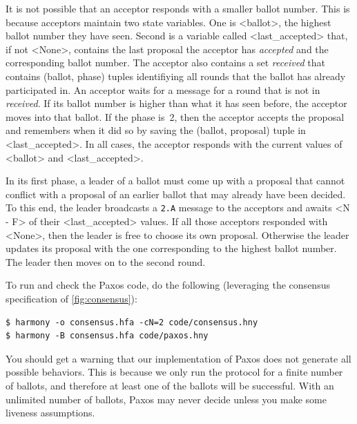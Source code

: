 \documentclass{report}
\newenvironment{code}{
\tcolorbox
}{
\endtcolorbox
}
\begin{document}
It is not possible that an acceptor responds with a smaller ballot
number.  This is because acceptors maintain two state variables.
One is <{ballot}>, the highest ballot number they have seen.
Second is a variable called <{last_accepted}> that, if not
<{None}>, contains the last proposal the acceptor has
\emph{accepted} and the corresponding ballot number.  The acceptor
also contains a set \emph{received} that contains (ballot, phase)
tuples identifiying all rounds that the ballot has already participated
in.  An acceptor waits for a message for a round that is not in
\emph{received}.  If its ballot number is higher than what it has
seen before, the acceptor moves into that ballot.  If the phase is~2,
then the acceptor accepts the proposal and remembers when it did
so by saving the (ballot, proposal) tuple in <{last_accepted}>.
In all cases, the acceptor responds with the current values of
<{ballot}> and <{last_accepted}>.

In its first phase, a leader of a ballot must come up with a proposal that
cannot conflict with a proposal of an earlier ballot that may already
have been decided.  To this end, the leader broadcasts a \texttt{2.A}
message to the acceptors and awaits <{N - F}> of their <{last_accepted}>
values.  If all those acceptors responded with <{None}>, then the leader
is free to choose its own proposal.  Otherwise the leader updates
its proposal with the one corresponding to the highest ballot number.
The leader then moves on to the second round.

To run and check the Paxos code, do the following (leveraging the
consensus specification of \autoref{fig:consensus}):
\begin{code}
\begin{verbatim}
$ harmony -o consensus.hfa -cN=2 code/consensus.hny
$ harmony -B consensus.hfa code/paxos.hny
\end{verbatim}
\end{code}

You should get a warning that our implementation of Paxos does not
generate all possible behaviors.
This is because we only run the protocol for a finite number of ballots,
and therefore at least one of the ballots will be successful.
With an unlimited number of ballots, Paxos may never decide unless you
make some liveness assumptions.
\end{document}
